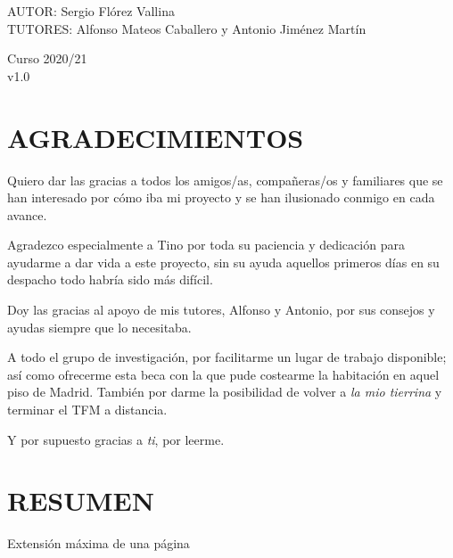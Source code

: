\documentclass[spanish,12pt, a4paper,twoside]{article}
\let\oldsection\section
\def\section{\cleardoublepage\oldsection}
\newcommand\blankpage{
    \null
    \thispagestyle{empty}
    \addtocounter{page}{-1}
    \newpage
}
\begin{document}
\begin{titlepage}
        \begin{flushright}
            \large
            AUTOR: Sergio Flórez Vallina\\
            TUTORES: Alfonso Mateos Caballero y \linebreak
            Antonio Jiménez Martín
        \end{flushright}

        \vspace{1.3cm}

        { 
        	{Curso 2020/21}%
    	}\\[0.8cm]
    
        {
            {v1.0}
        }

                    

        \vfill

    \end{titlepage}

    \afterpage{\blankpage}


    \section*{AGRADECIMIENTOS}
    Quiero dar las gracias a todos los amigos/as, compañeras/os y familiares que se han interesado por cómo iba mi proyecto y se han ilusionado conmigo en cada avance. 
    
    Agradezco especialmente a Tino por toda su paciencia y dedicación para ayudarme
    a dar vida a este proyecto, sin su ayuda aquellos primeros días en su despacho todo habría sido más difícil. 
    
    Doy las gracias al apoyo de mis tutores, Alfonso y Antonio, por sus consejos y ayudas siempre que lo necesitaba.
    
    A todo el grupo de investigación, por facilitarme un lugar de trabajo disponible; así como ofrecerme esta beca con la que pude costearme la habitación en aquel piso de Madrid. También por darme la posibilidad de volver a \textit{la mio tierrina} y terminar el TFM a distancia.
    
    Y por supuesto gracias a \textit{ti}, por leerme.

    \section*{RESUMEN}
    Extensión máxima de una página %
\end{document}
